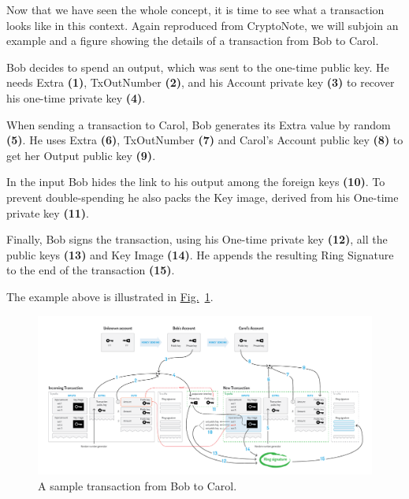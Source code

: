 Now that we have seen the whole concept, it is time to see what a transaction looks like in this context. Again reproduced from CryptoNote, we will subjoin an example and a figure showing the details of a transaction from Bob to Carol.

Bob decides to spend an output, which was sent to the one-time public key. He needs Extra \textbf{(1)}, TxOutNumber \textbf{(2)}, and his Account private key \textbf{(3)} to recover his one-time private key \textbf{(4)}.

When sending a transaction to Carol, Bob generates its Extra value by random \textbf{(5)}. He uses Extra \textbf{(6)}, TxOutNumber \textbf{(7)} and Carol's Account public key \textbf{(8)} to get her Output public key \textbf{(9)}.

In the input Bob hides the link to his output among the foreign keys \textbf{(10)}. To prevent double-spending he also packs the Key image, derived from his One-time private key \textbf{(11)}.

Finally, Bob signs the transaction, using his One-time private key \textbf{(12)}, all the public keys \textbf{(13)} and Key Image \textbf{(14)}. He appends the resulting Ring Signature to the end of the transaction \textbf{(15)}.

The example above is illustrated in \hyperref[fig:transaction]{Fig.}~\ref{fig:transaction}.\\
\begin{figure}[ht]
  \centering
  \includegraphics[width=0.9 \columnwidth,keepaspectratio]{Images/CryptoNote/transaction.png}
  \caption{A sample transaction from Bob to Carol.}
  \label{fig:transaction}
\end{figure}
%
